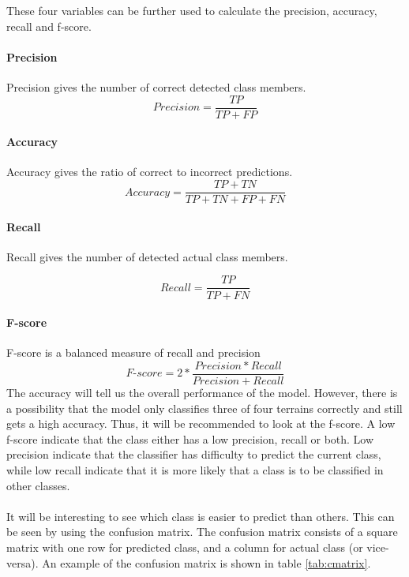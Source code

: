 \documentclass[USenglish]{ifimaster}  %
\begin{document}
	These four variables can be further used to calculate the precision, accuracy, recall and f-score.
	
	\paragraph{Precision}
	Precision gives the number of correct detected class members.
	\begin{equation}
	Precision = \frac{TP}{TP + FP}
	\label{eq:prec}
	\end{equation}
	
	\paragraph{Accuracy}
	Accuracy gives the ratio of correct to incorrect predictions.
	\begin{equation}
	Accuracy = \frac{TP + TN}{TP + TN + FP + FN}
	\label{eq:acc}
	\end{equation}
	
	\paragraph{Recall}
	Recall gives the number of detected actual class members.
	
	\begin{equation}
	Recall = \frac{TP}{TP + FN}
	\label{eq:recall}
	\end{equation}
	
	\paragraph{F-score}
	F-score is a balanced measure of recall and precision 
	\begin{equation}
	\textit{F-score} = 2*\frac{Precision*Recall}{Precision + Recall}
	\label{eq:fscore}
	\end{equation}
	\FloatBarrier
The accuracy will tell us the overall performance of the model. However, there is a possibility that the model only classifies three of four terrains correctly and still gets a high accuracy. Thus, it will be recommended to look at the f-score. A low f-score indicate that the class either has a low precision, recall or both. Low precision indicate that the classifier has difficulty to predict the current class, while low recall indicate that it is more likely that a class is to be classified in other classes.
\\
\\
It will be interesting to see which class is easier to predict than others. This can be seen by using the confusion matrix. The confusion matrix consists of a square matrix with one row for predicted class, and a column for actual class (or vice-versa). An example of the confusion matrix is shown in table \ref{tab:cmatrix}.
	
\end{document}

